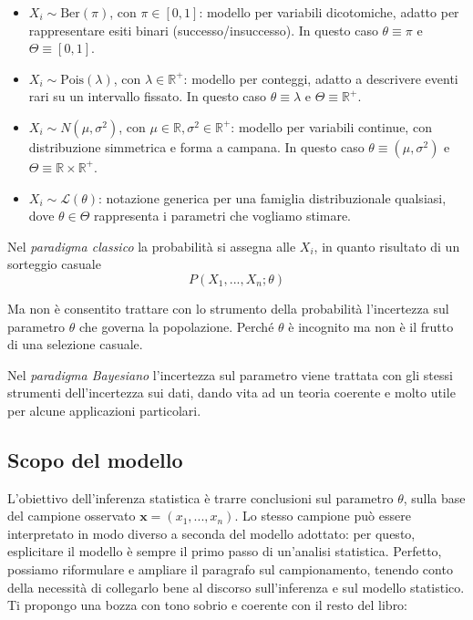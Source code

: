 \documentclass[
  11pt,
]{book}
\providecommand{\tightlist}{%
  \setlength{\itemsep}{0pt}\setlength{\parskip}{0pt}}
\theoremstyle{mytheoremstyle}
\theoremstyle{mydefstyle}
\begin{document}
\begin{itemize}
\tightlist
\item
  \(X_i \sim \text{Ber}(\pi)\), con \(\pi \in [0,1]\): modello per variabili dicotomiche, adatto per rappresentare esiti binari (successo/insuccesso). In questo caso \(\theta\equiv\pi\) e \(\Theta\equiv [0,1]\).
\item
  \(X_i \sim \text{Pois}(\lambda)\), con \(\lambda \in \mathbb{R}^+\): modello per conteggi, adatto a descrivere eventi rari su un intervallo fissato. In questo caso \(\theta\equiv\lambda\) e \(\Theta\equiv \mathbb{R}^+\).
\item
  \(X_i \sim N(\mu, \sigma^2)\), con \(\mu \in \mathbb{R}, \sigma^2 \in \mathbb{R}^+\): modello per variabili continue, con distribuzione simmetrica e forma a campana. In questo caso \(\theta\equiv(\mu,\sigma^2)\) e \(\Theta\equiv \mathbb{R}\times\mathbb{R}^+\).
\item
  \(X_i \sim \mathscr{L}(\theta)\): notazione generica per una famiglia distribuzionale qualsiasi, dove \(\theta \in \Theta\) rappresenta i parametri che vogliamo stimare.
\end{itemize}

Nel \emph{paradigma classico} la probabilità si assegna alle \(X_i\), in quanto risultato di un sorteggio casuale
\[P(X_1,...,X_n;\theta)\]

Ma non è consentito trattare con lo strumento della probabilità l'incertezza sul parametro \(\theta\) che governa la popolazione. Perché \(\theta\) è incognito ma non è il frutto di una selezione casuale.

Nel \emph{paradigma Bayesiano} l'incertezza sul parametro viene trattata con gli stessi strumenti dell'incertezza sui dati, dando vita ad un teoria coerente e molto utile per alcune applicazioni particolari.

\subsection{Scopo del modello}\label{scopo-del-modello}

L'obiettivo dell'inferenza statistica è trarre conclusioni sul parametro \(\theta\), sulla base del campione osservato \(\mathbf{x} = (x_1, ..., x_n)\). Lo stesso campione può essere interpretato in modo diverso a seconda del modello adottato: per questo, esplicitare il modello è sempre il primo passo di un'analisi statistica.
Perfetto, possiamo riformulare e ampliare il paragrafo sul campionamento, tenendo conto della necessità di collegarlo bene al discorso sull'inferenza e sul modello statistico. Ti propongo una bozza con tono sobrio e coerente con il resto del libro:
\end{document}
